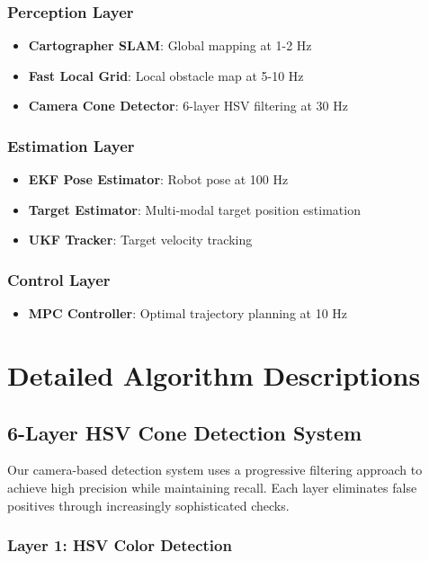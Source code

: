 \documentclass[11pt,a4paper]{article}
\begin{document}
\subsubsection{Perception Layer}
\begin{itemize}
    \item \textbf{Cartographer SLAM}: Global mapping at 1-2 Hz
    \item \textbf{Fast Local Grid}: Local obstacle map at 5-10 Hz
    \item \textbf{Camera Cone Detector}: 6-layer HSV filtering at 30 Hz
\end{itemize}

\subsubsection{Estimation Layer}
\begin{itemize}
    \item \textbf{EKF Pose Estimator}: Robot pose at 100 Hz
    \item \textbf{Target Estimator}: Multi-modal target position estimation
    \item \textbf{UKF Tracker}: Target velocity tracking
\end{itemize}

\subsubsection{Control Layer}
\begin{itemize}
    \item \textbf{MPC Controller}: Optimal trajectory planning at 10 Hz
\end{itemize}

\section{Detailed Algorithm Descriptions}

\subsection{6-Layer HSV Cone Detection System}

Our camera-based detection system uses a progressive filtering approach to achieve high precision while maintaining recall. Each layer eliminates false positives through increasingly sophisticated checks.

\subsubsection{Layer 1: HSV Color Detection}
\end{document}
